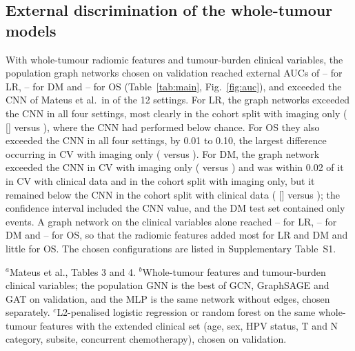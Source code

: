 \documentclass[11pt,a4paper]{article}
\newcommand{\tabnote}[1]{\par\vspace{3pt}\begin{minipage}{\linewidth}\footnotesize #1\end{minipage}}
\begin{document}
\subsection{External discrimination of the whole-tumour models}
With whole-tumour radiomic features and tumour-burden clinical variables, the population graph networks chosen on validation reached external AUCs of \mainLRMin--\mainLRMax{} for LR, \mainDMMin--\mainDMMax{} for DM and \mainOSMin--\mainOSMax{} for OS (Table~\ref{tab:main}, Fig.~\ref{fig:auc}), and exceeded the CNN of Mateus et al.\ in \winsGraph{} of the 12 settings. For LR, the graph networks exceeded the CNN in all four settings, most clearly in the cohort split with imaging only (\mainLRCohImg{} [\mainCILRCohImg] versus \cnnLRCohImg), where the CNN had performed below chance. For OS they also exceeded the CNN in all four settings, by 0.01 to 0.10, the largest difference occurring in CV with imaging only (\mainOSCVImg{} versus \cnnOSCVImg). For DM, the graph network exceeded the CNN in CV with imaging only (\mainDMCVImg{} versus \cnnDMCVImg) and was within 0.02 of it in CV with clinical data and in the cohort split with imaging only, but it remained below the CNN in the cohort split with clinical data (\mainDMCohClin{} [\mainCIDMCohClin] versus \cnnDMCohClin); the confidence interval included the CNN value, and the DM test set contained only \eTestDM{} events. A graph network on the clinical variables alone reached \clinOnlyLRMin--\clinOnlyLRMax{} for LR, \clinOnlyDMMin--\clinOnlyDMMax{} for DM and \clinOnlyOSMin--\clinOnlyOSMax{} for OS, so that the radiomic features added most for LR and DM and little for OS. The chosen configurations are listed in Supplementary Table~S1.

\begin{table}[!htb]
\centering
\caption{External discrimination on MAASTRO (HN1) of the whole-tumour models chosen on validation, compared with the CNN. CV: mean (range) of the five per-fold AUCs; cohort split: AUC [95\% bootstrap confidence interval]. Bold: above the CNN.}\label{tab:main}
\small
\setlength{\tabcolsep}{4.5pt}

\tabnote{$^{a}$Mateus et al.\cite{mateus2023}, Tables 3 and 4. $^{b}$Whole-tumour features and tumour-burden clinical variables; the population GNN is the best of GCN, GraphSAGE and GAT on validation, and the MLP is the same network without edges, chosen separately. $^{c}$L2-penalised logistic regression or random forest on the same whole-tumour features with the extended clinical set (age, sex, HPV status, T and N category, subsite, concurrent chemotherapy), chosen on validation.}
\end{table}
\end{document}
